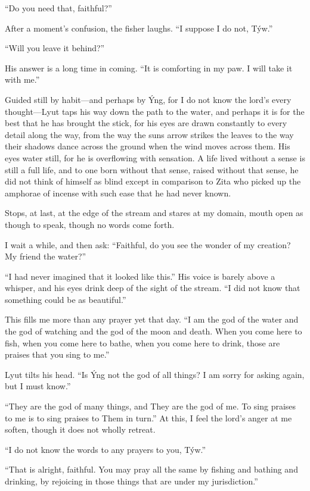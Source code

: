 ``Do you need that, faithful?''

After a moment's confusion, the fisher laughs. ``I suppose I do not, Týw.''

``Will you leave it behind?''

His answer is a long time in coming. ``It is comforting in my paw. I will take it with me.''

Guided still by habit---and perhaps by Ýng, for I do not know the lord's every thought---Lyut taps his way down the path to the water, and perhaps it is for the best that he has brought the stick, for his eyes are drawn constantly to every detail along the way, from the way the suns arrow strikes the leaves to the way their shadows dance across the ground when the wind moves across them. His eyes water still, for he is overflowing with sensation. A life lived without a sense is still a full life, and to one born without that sense, raised without that sense, he did not think of himself as blind except in comparison to Zita who picked up the amphorae of incense with such ease that he had never known.

Stops, at last, at the edge of the stream and stares at my domain, mouth open as though to speak, though no words come forth.

I wait a while, and then ask: ``Faithful, do you see the wonder of my creation? My friend the water?''

``I had never imagined that it looked like this.'' His voice is barely above a whisper, and his eyes drink deep of the sight of the stream. ``I did not know that something could be as beautiful.''

This fills me more than any prayer yet that day. ``I am the god of the water and the god of watching and the god of the moon and death. When you come here to fish, when you come here to bathe, when you come here to drink, those are praises that you sing to me.''

Lyut tilts his head. ``Is Ýng not the god of all things? I am sorry for asking again, but I must know.''

``They are the god of many things, and They are the god of me. To sing praises to me is to sing praises to Them in turn.'' At this, I feel the lord's anger at me soften, though it does not wholly retreat.

``I do not know the words to any prayers to you, Týw.''

``That is alright, faithful. You may pray all the same by fishing and bathing and drinking, by rejoicing in those things that are under my jurisdiction.''

